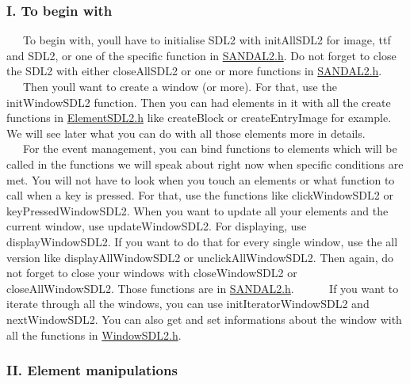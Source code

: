\subsubsection*{I. To begin with}

~~~To begin with, you\textquotesingle{}ll have to initialise S\+D\+L2 with init\+All\+S\+D\+L2 for image, ttf and S\+D\+L2, or one of the specific function in \hyperlink{SANDAL2_8h}{S\+A\+N\+D\+A\+L2.\+h}. Do not forget to close the S\+D\+L2 with either close\+All\+S\+D\+L2 or one or more functions in \hyperlink{SANDAL2_8h}{S\+A\+N\+D\+A\+L2.\+h}.~\newline
~\newline
 ~~~Then you\textquotesingle{}ll want to create a window (or more). For that, use the init\+Window\+S\+D\+L2 function. Then you can had elements in it with all the create functions in \hyperlink{ElementSDL2_8h}{Element\+S\+D\+L2.\+h} like create\+Block or create\+Entry\+Image for example. We will see later what you can do with all those elements more in details.~\newline
~\newline
 ~~~For the event management, you can bind functions to elements which will be called in the functions we will speak about right now when specific conditions are met. You will not have to look when you touch an elements or what function to call when a key is pressed. For that, use the functions like click\+Window\+S\+D\+L2 or key\+Pressed\+Window\+S\+D\+L2. When you want to update all your elements and the current window, use update\+Window\+S\+D\+L2. For displaying, use display\+Window\+S\+D\+L2. If you want to do that for every single window, use the \textquotesingle{}all\textquotesingle{} version like display\+All\+Window\+S\+D\+L2 or unclick\+All\+Window\+S\+D\+L2. Then again, do not forget to close your windows with close\+Window\+S\+D\+L2 or close\+All\+Window\+S\+D\+L2. Those functions are in \hyperlink{SANDAL2_8h}{S\+A\+N\+D\+A\+L2.\+h}.~\newline
~\newline
 ~~~If you want to iterate through all the windows, you can use init\+Iterator\+Window\+S\+D\+L2 and next\+Window\+S\+D\+L2. You can also get and set informations about the window with all the functions in \hyperlink{WindowSDL2_8h}{Window\+S\+D\+L2.\+h}.~\newline


\subsubsection*{II. Element manipulations}

